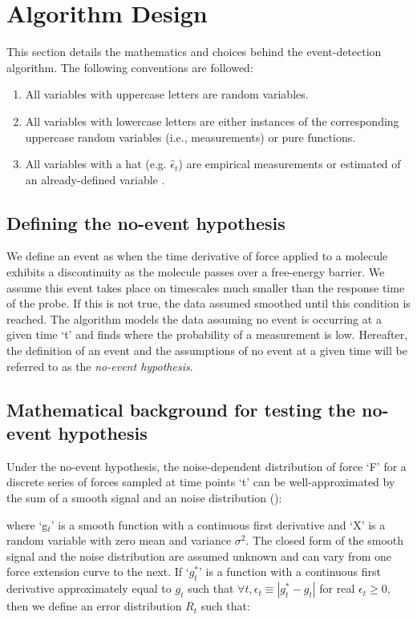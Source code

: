 \chapter{ Algorithm Design}

This section details the mathematics and choices behind the event-detection algorithm. The following conventions are followed:

\begin{enumerate}
 \item All variables with uppercase letters are random variables.
 \item All variables with lowercase letters are either instances of the corresponding uppercase random variables (i.e., measurements) or pure functions.
 \item All variables with a hat (e.g. $\hat{\epsilon}_t$) are empirical measurements or estimated of an already-defined variable .
\end{enumerate}

\section{Defining the no-event hypothesis}

\firstp We define an event as when the time derivative of force applied to a molecule exhibits a discontinuity as the molecule passes over a free-energy barrier. We assume this event takes place on timescales much smaller than the response time of the probe. If this is not true, the data assumed smoothed until this condition is reached. The algorithm models the data assuming no event is occurring at a given time `t' and finds where the probability of a measurement is low. Hereafter, the definition of an event and the assumptions of no event at a given time will be referred to as the \emph{no-event hypothesis}. 

\section{Mathematical background for testing the no-event hypothesis}

\firstp Under the no-event hypothesis, the noise-dependent distribution of force `F' for a discrete series of forces sampled at time points `t' can be well-approximated by the sum of a smooth signal and an noise distribution ():


where `g$_t$' is a smooth function with a continuous first derivative and `X' is a random variable with zero mean and variance $\sigma^2$. The closed form of the smooth signal and the noise distribution are assumed unknown and can vary from one force extension curve to the next. If `$g^{*}_t$' is a function with a continuous first derivative approximately equal to $g_t$ such that $\forall t,\epsilon_t\equiv|g^{*}_t-g_t|$ for real $\epsilon_t\ge 0$, then we define an error distribution $R_t$ such that: \pl

